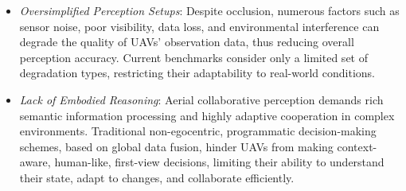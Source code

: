 \documentclass[letterpaper]{article} %
\begin{document}
\begin{itemize}[left=0pt]
    \item \textit{Oversimplified Perception Setups}:
    Despite occlusion, numerous factors such as sensor noise, poor visibility, data loss, and environmental interference can degrade the quality of UAVs' observation data, thus reducing overall perception accuracy. Current benchmarks consider only a limited set of degradation types, restricting their adaptability to real-world conditions.

    
    \item  \textit{Lack of Embodied Reasoning}: 
    Aerial collaborative perception demands rich semantic information processing and highly adaptive cooperation in complex environments. Traditional non-egocentric, programmatic decision-making schemes, based on global data fusion, hinder UAVs from making context-aware, human-like, first-view decisions, limiting their ability to understand their state, adapt to changes, and collaborate efficiently.

\end{itemize}
\end{document}

